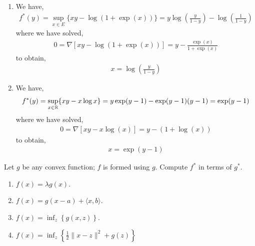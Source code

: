 \documentclass[10pt]{article}
\begin{document}
\begin{solution}[Solution]
\begin{enumerate}[label=(\alph*)]
    \item We have,
        \begin{align*}
            f^*(y) = \sup_{x\in E} \{ xy - \log(1+\exp(x)) \} 
            = y \log \left( \frac{y}{1-y} \right) - \log\left(\frac{1}{1-y} \right)
        \end{align*}
        where we have solved,
        \begin{align*}
            0 = \nabla \left[ xy-\log(1+\exp(x)) \right]
            = y - \frac{\exp(x)}{1+\exp(x)}
        \end{align*}
        to obtain,
        \begin{align*}
            x = \log \left( \frac{y}{1-y} \right)
        \end{align*}
        
    \item We have,
        \begin{align*}
            f^*(y) = \sup_{x\in\mathbb{R}} \{ xy - x\log x \}
            = y \exp(y-1) - \exp(y-1) (y-1)
            = \exp(y-1)
        \end{align*}
        where we have solved,
        \begin{align*}
            0 = \nabla \left[ xy - x\log(x) \right]
            = y - (1+\log(x))
        \end{align*}
        to obtain,
        \begin{align*}
            x = \exp(y-1)
        \end{align*}
        
        



\end{enumerate}
\end{solution}

\begin{problem}[Problem 2]
Let \( g \) be any convex function; \( f \) is formed using \( g \).
Compute \( f^* \) in terms of \( g^* \).  
\begin{enumerate}[label=(\alph*),nolistsep]
\item \( f(x) = \lambda g(x) \).
\item \( f(x) = g(x-a) + \langle x, b \rangle \).
\item \( f(x) = \inf_z \left\{g(x,z)\right\} \). 
\item \( f(x) = \inf_z \left\{\frac{1}{2}\|x-z\|^2 + g(z)\right\} \)
\end{enumerate}
\end{problem}
\end{document}
